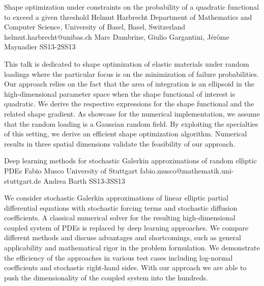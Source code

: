 \begin{talk}
  {Shape optimization under constraints on the probability of a quadratic functional to exceed a given threshold}%
  {Helmut Harbrecht}%
  {Department of Mathematics and Computer Science, University of Basel, Basel, Switzerland}%
  {helmut.harbrecht@unibas.ch}%
  {Marc Dambrine, Giulio Gargantini, J\'er\^{o}me Maynadier}%
{}{}{SS13-2}{SS13}

			
This talk is dedicated to shape optimization of elastic materials 
under random loadings where the particular focus is on the 
minimization of failure probabilities. Our approach relies on the 
fact that the area of integration is an ellipsoid in the high-dimensional
parameter space when the shape functional of interest is quadratic.
We derive the respective expressions for the shape functional and the 
related shape gradient. As showcase for the numerical implementation, 
we assume that the random loading is a Gaussian random field. By 
exploiting the specialties of this setting, we derive an efficient shape
optimization algorithm. Numerical results in three spatial dimensions 
validate the feasibility of our approach.
\end{talk}

\begin{talk}
  {Deep learning methods for stochastic Galerkin approximations of random elliptic PDEs}%
  {Fabio Musco}%
  {University of Stuttgart}%
  {fabio.musco@mathematik.uni-stuttgart.de}%
  {Andrea Barth}%
{}{}{SS13-3}{SS13}

			
We consider stochastic Galerkin approximations of linear elliptic partial differential equations with stochastic forcing terms and stochastic diffusion coefficients. A classical numerical solver for the resulting high-dimensional coupled system of PDEs is replaced by deep learning approaches. We compare different methods and discuss advantages and shortcomings, such as general applicability and mathematical rigor in the problem formulation. We demonstrate the efficiency of the approaches in various test cases including log-normal coefficients and stochastic right-hand sides. With our approach we are able to push the dimensionality of the coupled system into the hundreds.

\end{talk}

